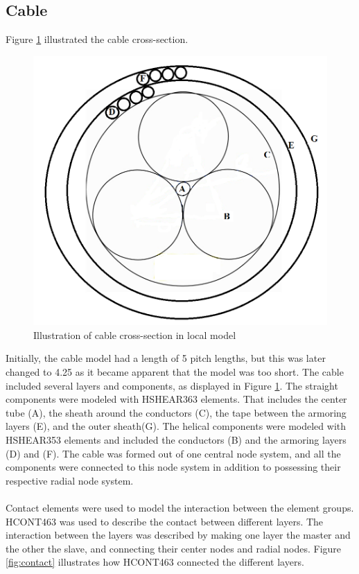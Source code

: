 \subsection{Cable}
 Figure \ref{fig:crosspro} illustrated the cable cross-section.
\begin{figure}[H]
\centering
\includegraphics[scale=0.8]{figures/cross2}
\caption [$\; \:$ Cable cross-section in the local model]{Illustration of cable cross-section in local model}
 \label{fig:crosspro}
\end{figure}
Initially, the cable model had a length of 5 pitch lengths, but this was later changed to 4.25 as it became apparent that the model was too short. The cable included several layers and components, as displayed in Figure \ref{fig:crosspro}.  The straight components were modeled with HSHEAR363 elements. That includes the center tube (A), the sheath around the conductors (C), the tape between the armoring layers (E), and the outer sheath(G). The helical components were modeled with HSHEAR353 elements and included the conductors (B) and the armoring layers (D) and (F). The cable was formed out of one central node system, and all the components were connected to this node system in addition to possessing their respective radial node system.\\\\ Contact elements were used to model the interaction between the element groups. HCONT463 was used to describe the contact between different layers. The interaction between the layers was described by making one layer the master and the other the slave, and connecting their center nodes and radial nodes.  Figure \ref{fig:contact} illustrates how HCONT463 connected the different layers.


